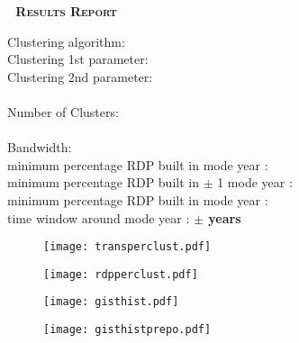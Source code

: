 \documentclass[12pt]{article}
\begin{document}


\vspace{2mm}
\begin{center}
\large{}\selectfont\bfseries\scshape{$\,\,\,\,$Results Report}
\end{center}
\vspace{5mm}

\noindent Clustering algorithm: {\bf} \\
\noindent Clustering 1st parameter: {\bf} \\
\noindent Clustering 2nd parameter: {\bf} \\ \\
\noindent Number of Clusters: {\bf} \\ \\
\noindent Bandwidth: {\bfm} \\
\noindent minimum percentage RDP built in mode year : {\bf} \\
\noindent minimum percentage RDP built in $\pm$ 1 mode year : {\bf} \\
\noindent minimum percentage RDP built in mode year : {\bf} \\
\noindent time window around mode year : {\bf$\pm$ years} \\ 

\begin{figure}[H]
\centering
\begin{minipage}{.5\textwidth}
  \centering
  \texttt{[image: transperclust.pdf]}
\end{minipage}%
\begin{minipage}{.5\textwidth}
  \centering
  \texttt{[image: rdpperclust.pdf]}
\end{minipage}
\end{figure}

\begin{figure}[H]
\centering
\begin{minipage}{.5\textwidth}
  \centering
  \texttt{[image: gisthist.pdf]}
\end{minipage}%
\begin{minipage}{.5\textwidth}
  \centering
  \texttt{[image: gisthistprepo.pdf]}
\end{minipage}
\end{figure}
\end{document}

